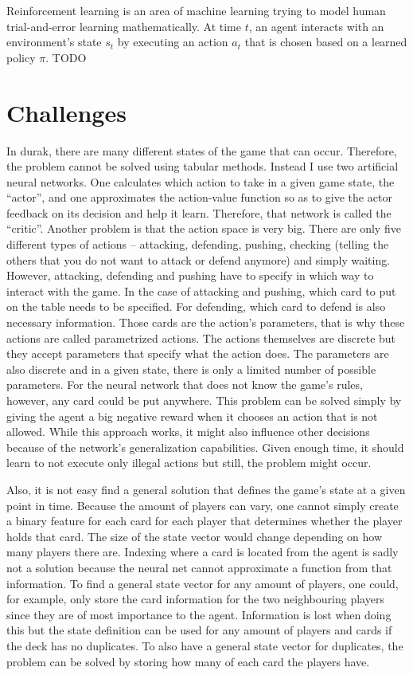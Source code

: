 \documentclass[a4paper,titlepage]{article}
\begin{document}
Reinforcement learning is an area of machine learning trying to model human trial-and-error learning mathematically. At time $t$, an agent interacts with an environment's state $s_t$ by executing an action $a_t$ that is chosen based on a learned policy $\pi$.
TODO

\section{Challenges}

In durak, there are many different states of the game that can occur. Therefore, the problem cannot be solved using tabular methods. Instead I use two artificial neural networks. One calculates which action to take in a given game state, the ``actor'', and one approximates the action-value function so as to give the actor feedback on its decision and help it learn. Therefore, that network is called the ``critic''.
Another problem is that the action space is very big. There are only five different types of actions -- attacking, defending, pushing, checking (telling the others that you do not want to attack or defend anymore) and simply waiting. However, attacking, defending and pushing have to specify in which way to interact with the game. In the case of attacking and pushing, which card to put on the table needs to be specified. For defending, which card to defend is also necessary information. Those cards are the action's parameters, that is why these actions are called parametrized actions. The actions themselves are discrete but they accept parameters that specify what the action does. The parameters are also discrete and in a given state, there is only a limited number of possible parameters. For the neural network that does not know the game's rules, however, any card could be put anywhere. This problem can be solved simply by giving the agent a big negative reward when it chooses an action that is not allowed. While this approach works, it might also influence other decisions because of the network's generalization capabilities. Given enough time, it should learn to not execute only illegal actions but still, the problem might occur.

Also, it is not easy find a general solution that defines the game's state at a given point in time. Because the amount of players can vary, one cannot simply create a binary feature for each card for each player that determines whether the player holds that card. The size of the state vector would change depending on how many players there are. Indexing where a card is located from the agent is sadly not a solution because the neural net cannot approximate a function from that information.
To find a general state vector for any amount of players, one could, for example, only store the card information for the two neighbouring players since they are of most importance to the agent. Information is lost when doing this but the state definition can be used for any amount of players and cards if the deck has no duplicates. To also have a general state vector for duplicates, the problem can be solved by storing how many of each card the players have.
\end{document}
